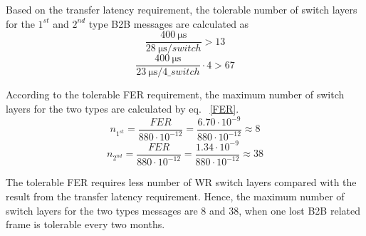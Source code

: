 Based on the transfer latency requirement, the tolerable number of switch layers for the $1^\mathit{st}$ and $2^\mathit{nd}$ type B2B messages are calculated as
\begin{equation}
		\frac{\SI{400}{\us}}{\SI{28}{\us/switch}}>13
\end{equation}
\begin{equation}
		\frac{\SI{400}{\us}}{\SI{23}{\us/4\_switch}}\cdot 4 > 67
\end{equation}

According to the tolerable FER requirement, the maximum number of switch layers for the two types are calculated by eq. ~\ref{FER}.  
\begin{equation}
n_{1^{st}}=\frac{FER}{880\cdot10^{-12}}=\frac{6.70\cdot 10^{-9}}{880\cdot10^{-12}}\approx 8
\end{equation}
\begin{equation}
n_{2^{nd}}=\frac{FER}{880\cdot10^{-12}}=\frac{1.34\cdot 10^{-9}}{880\cdot10^{-12}}\approx 38
\end{equation}

The tolerable FER requires less number of WR switch layers compared with the result from the transfer latency requirement. Hence, the maximum number of switch layers for the two types messages are 8 and 38, when one lost B2B related frame is tolerable every two months. 

